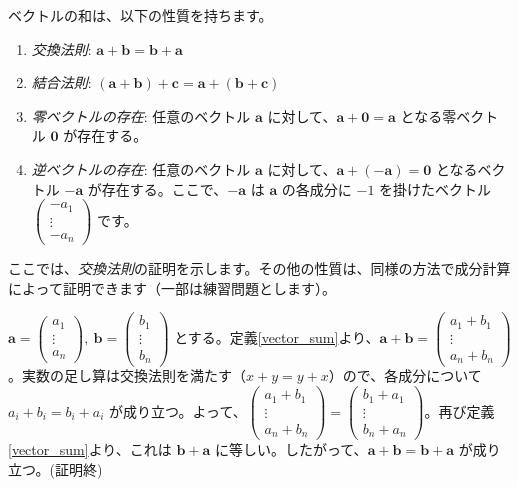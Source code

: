 \begin{thm}[ベクトルの和の性質] \label{vector_sum_property}
ベクトルの和は、以下の性質を持ちます。
\begin{enumerate}
\item \emph{交換法則}: $\bm{a} + \bm{b} = \bm{b} + \bm{a}$
\item \emph{結合法則}: $(\bm{a} + \bm{b}) + \bm{c} = \bm{a} + (\bm{b} + \bm{c})$
\item \emph{零ベクトルの存在}: 任意のベクトル $\bm{a}$ に対して、$\bm{a} + \bm{0} = \bm{a}$ となる零ベクトル $\bm{0}$ が存在する。
\item \emph{逆ベクトルの存在}: 任意のベクトル $\bm{a}$ に対して、$\bm{a} + (-\bm{a}) = \bm{0}$ となるベクトル $-\bm{a}$ が存在する。ここで、$-\bm{a}$ は $\bm{a}$ の各成分に $-1$ を掛けたベクトル $\begin{pmatrix} -a_1 \\ \vdots \\ -a_n \end{pmatrix}$ です。
\end{enumerate}
\begin{proof*}
ここでは、\emph{交換法則}の証明を示します。その他の性質は、同様の方法で成分計算によって証明できます（一部は練習問題とします）。\par
$\bm{a} = \begin{pmatrix} a_1 \\ \vdots \\ a_n \end{pmatrix},\ \bm{b} = \begin{pmatrix} b_1 \\ \vdots \\ b_n \end{pmatrix}$ とする。定義\ref{vector_sum}より、$\bm{a} + \bm{b} = \begin{pmatrix} a_1 + b_1 \\ \vdots \\ a_n + b_n \end{pmatrix}$。実数の足し算は交換法則を満たす（$x+y = y+x$）ので、各成分について $a_i + b_i = b_i + a_i$ が成り立つ。よって、$\begin{pmatrix} a_1 + b_1 \\ \vdots \\ a_n + b_n \end{pmatrix} = \begin{pmatrix} b_1 + a_1 \\ \vdots \\ b_n + a_n \end{pmatrix}$。再び定義\ref{vector_sum}より、これは $\bm{b} + \bm{a}$ に等しい。したがって、$\bm{a} + \bm{b} = \bm{b} + \bm{a}$ が成り立つ。(証明終)
\end{proof*}
\end{thm}

